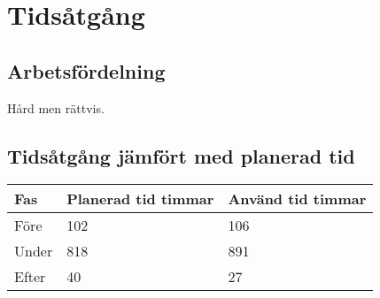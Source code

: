 
\section{Tidsåtgång}

\subsection{Arbetsfördelning}

Hård men rättvis.

\subsection{Tidsåtgång jämfört med planerad tid}
\begin{table}[h!]
\centering
\begin{tabular}{| l | l | l |}
	\hline
	{\textbf{Fas}} & {Planerad tid timmar} & {Använd tid timmar} \\\hline
	{Före} & {102} & {106} \\\hline
	{Under} & {818} & {891} \\\hline
	{Efter} & {40} & {27} \\\hline	

\end{tabular}
\end{table}